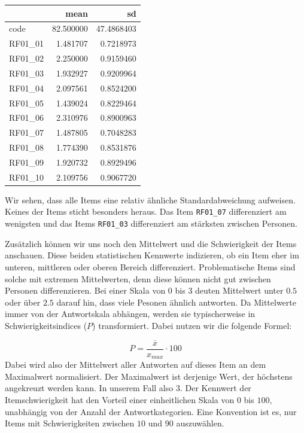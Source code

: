 \documentclass[
  ngerman,
]{book}
\begin{document}
\begin{tabular}{l|r|r}
\hline
  & mean & sd\\
\hline
code & 82.500000 & 47.4868403\\
\hline
RF01\_01 & 1.481707 & 0.7218973\\
\hline
RF01\_02 & 2.250000 & 0.9159460\\
\hline
RF01\_03 & 1.932927 & 0.9209964\\
\hline
RF01\_04 & 2.097561 & 0.8524200\\
\hline
RF01\_05 & 1.439024 & 0.8229464\\
\hline
RF01\_06 & 2.310976 & 0.8900963\\
\hline
RF01\_07 & 1.487805 & 0.7048283\\
\hline
RF01\_08 & 1.774390 & 0.8531876\\
\hline
RF01\_09 & 1.920732 & 0.8929496\\
\hline
RF01\_10 & 2.109756 & 0.9067720\\
\hline
\end{tabular}

Wir sehen, dass alle Items eine relativ ähnliche Standardabweichung aufweisen. Keines der Items sticht besonders heraus. Das Item \texttt{RF01\_07} differenziert am wenigsten und das Items \texttt{RF01\_03} differenziert am stärksten zwischen Personen.

Zusätzlich können wir uns noch den Mittelwert und die Schwierigkeit der Items anschauen. Diese beiden statistischen Kennwerte indizieren, ob ein Item eher im unteren, mittleren oder oberen Bereich differenziert. Problematische Items sind solche mit extremen Mittelwerten, denn diese können nicht gut zwischen Personen differenzieren. Bei einer Skala von \(0\) bis \(3\) deuten Mittelwert unter \(0.5\) oder über \(2.5\) darauf hin, dass viele Pesonen ähnlich antworten. Da Mittelwerte immer von der Antwortskala abhängen, werden sie typischerweise in Schwierigkeitsindices (\(P\)) transformiert. Dabei nutzen wir die folgende Formel:

\[P = \frac{\overline{x}}{x_{max}}\cdot 100\]
Dabei wird also der Mittelwert aller Antworten auf dieses Item an dem Maximalwert normalisiert. Der Maximalwert ist derjenige Wert, der höchstens angekreuzt werden kann. In unserem Fall also \(3\). Der Kennwert der Itemschwierigkeit hat den Vorteil einer einheitlichen Skala von \(0\) bis \(100\), unabhängig von der Anzahl der Antwortkategorien. Eine Konvention ist es, nur Items mit Schwierigkeiten zwischen \(10\) und \(90\) auszuwählen.
\end{document}

